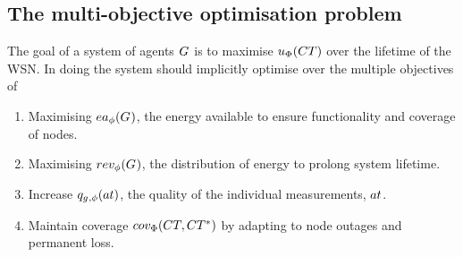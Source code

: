 \subsection{The multi-objective optimisation problem}

The goal of a system of agents $G_{}^{}$ is to maximise $\functionSystemUtility{}{}$ over the lifetime of the WSN. In doing the system should   implicitly optimise over the multiple objectives of
\begin{enumerate}
	\item Maximising $\functionEnergyAvailable{}{}$, the energy available to ensure functionality and coverage of nodes.
	\item Maximising $\functionEnergyVariability{}{}$,  the distribution of energy to prolong system lifetime.
	\item Increase $\functionAtomicTaskQualitySignature{}{}$, the quality of the individual measurements, $\varAtomicTask{}{}$.
	\item Maintain coverage $\functionSystemCoverage{}{}$ by adapting to node outages and permanent loss.
\end{enumerate}